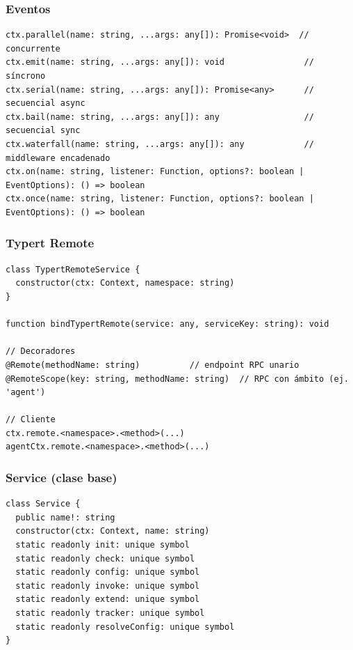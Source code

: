 \documentclass[11pt,a4paper]{article}
\begin{document}
\subsubsection*{Eventos}


\begin{lstlisting}
ctx.parallel(name: string, ...args: any[]): Promise<void>  // concurrente
ctx.emit(name: string, ...args: any[]): void                // síncrono
ctx.serial(name: string, ...args: any[]): Promise<any>      // secuencial async
ctx.bail(name: string, ...args: any[]): any                 // secuencial sync
ctx.waterfall(name: string, ...args: any[]): any            // middleware encadenado
ctx.on(name: string, listener: Function, options?: boolean | EventOptions): () => boolean
ctx.once(name: string, listener: Function, options?: boolean | EventOptions): () => boolean
\end{lstlisting}


\subsubsection*{Typert Remote}


\begin{lstlisting}
class TypertRemoteService {
  constructor(ctx: Context, namespace: string)
}

function bindTypertRemote(service: any, serviceKey: string): void

// Decoradores
@Remote(methodName: string)          // endpoint RPC unario
@RemoteScope(key: string, methodName: string)  // RPC con ámbito (ej. 'agent')

// Cliente
ctx.remote.<namespace>.<method>(...)
agentCtx.remote.<namespace>.<method>(...)
\end{lstlisting}


\subsubsection*{Service (clase base)}


\begin{lstlisting}
class Service {
  public name!: string
  constructor(ctx: Context, name: string)
  static readonly init: unique symbol
  static readonly check: unique symbol
  static readonly config: unique symbol
  static readonly invoke: unique symbol
  static readonly extend: unique symbol
  static readonly tracker: unique symbol
  static readonly resolveConfig: unique symbol
}
\end{lstlisting}
\end{document}
